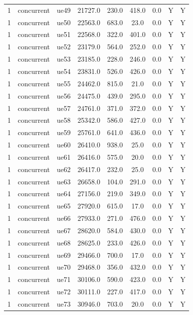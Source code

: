 \begin{table}[ht]
\begin{tabular}{|c|c|c|c|c|c|c|c|c|}
1 & concurrent & ue49 & 21727.0 & 230.0 & 418.0 & 0.0 & Y & Y \\
1 & concurrent & ue50 & 22563.0 & 683.0 & 23.0 & 0.0 & Y & Y \\
1 & concurrent & ue51 & 22568.0 & 322.0 & 401.0 & 0.0 & Y & Y \\
1 & concurrent & ue52 & 23179.0 & 564.0 & 252.0 & 0.0 & Y & Y \\
1 & concurrent & ue53 & 23185.0 & 228.0 & 246.0 & 0.0 & Y & Y \\
1 & concurrent & ue54 & 23831.0 & 526.0 & 426.0 & 0.0 & Y & Y \\
1 & concurrent & ue55 & 24462.0 & 815.0 & 21.0 & 0.0 & Y & Y \\
1 & concurrent & ue56 & 24475.0 & 439.0 & 295.0 & 0.0 & Y & Y \\
1 & concurrent & ue57 & 24761.0 & 371.0 & 372.0 & 0.0 & Y & Y \\
1 & concurrent & ue58 & 25342.0 & 586.0 & 427.0 & 0.0 & Y & Y \\
1 & concurrent & ue59 & 25761.0 & 641.0 & 436.0 & 0.0 & Y & Y \\
1 & concurrent & ue60 & 26410.0 & 938.0 & 25.0 & 0.0 & Y & Y \\
1 & concurrent & ue61 & 26416.0 & 575.0 & 20.0 & 0.0 & Y & Y \\
1 & concurrent & ue62 & 26417.0 & 232.0 & 25.0 & 0.0 & Y & Y \\
1 & concurrent & ue63 & 26658.0 & 104.0 & 291.0 & 0.0 & Y & Y \\
1 & concurrent & ue64 & 27156.0 & 219.0 & 349.0 & 0.0 & Y & Y \\
1 & concurrent & ue65 & 27920.0 & 615.0 & 17.0 & 0.0 & Y & Y \\
1 & concurrent & ue66 & 27933.0 & 271.0 & 476.0 & 0.0 & Y & Y \\
1 & concurrent & ue67 & 28620.0 & 584.0 & 430.0 & 0.0 & Y & Y \\
1 & concurrent & ue68 & 28625.0 & 233.0 & 426.0 & 0.0 & Y & Y \\
1 & concurrent & ue69 & 29466.0 & 700.0 & 17.0 & 0.0 & Y & Y \\
1 & concurrent & ue70 & 29468.0 & 356.0 & 432.0 & 0.0 & Y & Y \\
1 & concurrent & ue71 & 30106.0 & 590.0 & 423.0 & 0.0 & Y & Y \\
1 & concurrent & ue72 & 30111.0 & 227.0 & 417.0 & 0.0 & Y & Y \\
1 & concurrent & ue73 & 30946.0 & 703.0 & 20.0 & 0.0 & Y & Y \\

\end{tabular}
\end{table}
